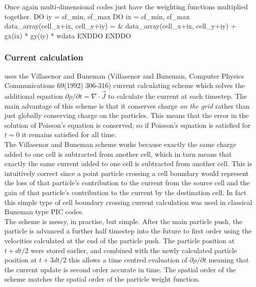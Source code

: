 \documentclass[12pt,a4paper]{article}
\newcommand{\EPOCH}{{\color{warwickdark}\fontfamily{phv}\selectfont{EPOCH}}}
\newenvironment{boxverbatim}{\lboxverbatim{none}}{\endlboxverbatim}
\begin{document}
Once again multi-dimensional codes just have the weighting functions multiplied
together.
\begin{boxverbatim}
  DO iy = sf_min, sf_max
    DO ix = sf_min, sf_max
      data_array(cell_x+ix, cell_y+iy) = &
          data_array(cell_x+ix, cell_y+iy) + gx(ix) * gy(iy) * wdata
    ENDDO
  ENDDO
\end{boxverbatim}

\subsubsection{Current calculation}
{\EPOCH} uses the Villasenor and Buneman (Villasenor and Buneman, Computer
Physics Communications 69(1992) 306-316) current calculating scheme which
solves the additional equation
${\partial \rho}/{\partial t} = \nabla\cdot\vec{J}$ to
calculate the current at each timestep. The main advantage of this scheme is
that it conserves charge {\it on the grid} rather than just globally conserving
charge on the particles. This means that the error in the solution of Poisson's
equation is conserved, so if Poisson's equation is satisfied for $t = 0$ it
remains satisfied for all time.\\

The Villasenor and Buneman scheme works because exactly the same charge added
to one cell is subtracted from another cell, which in turn means that exactly
the same current added to one cell is subtracted from another cell. This is
intuitively correct since a point particle crossing a cell boundary would
represent the loss of that particle's contribution to the current from the
source cell and the gain of that particle's contribution to the current by the
destination cell. In fact this simple type of cell boundary crossing
current calculation was used in classical Buneman type PIC codes.\\

The scheme is messy, in practise, but simple. After the main particle push, the
particle is advanced a further half timestep into the future to first order
using the velocities calculated at the end of the particle push. The particle
position at $t + dt/2$ were stored earlier, and combined with the newly
calculated particle position at $t + {3dt}/{2}$ this allows a time centred
evaluation of ${\partial \rho}/{\partial t}$ meaning that the current
update is second order accurate in time. The spatial order of the scheme
matches the spatial order of the particle weight function.\\
\end{document}
